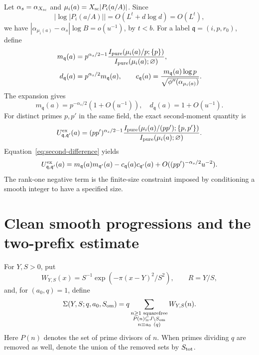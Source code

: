Let \(\alpha_s=\alpha_{X_{\rm sc}}\) and
\(\mu_i(a)=X_{\rm sc}|P_i(a/A)|\).  Since
\[
 |\log|P_i(a/A)||=O(L^t+d\log d)=O(L^t),
\]
we have
\( |\alpha_{\mu_i(a)}-\alpha_s|\log B=o(u^{-1})\), by \(t<b\).
For a label \(\mathfrak q=(i,p,r_0)\), define
\begin{align*}
 m_{\mathfrak q}(a)
 &=p^{\alpha_s/2-1}
       \frac{I_{\rm pure}(\mu_i(a)/p;\{p\})}
            {I_{\rm pure}(\mu_i(a);\varnothing)},\\
 d_{\mathfrak q}(a)&=p^{\alpha_s/2}m_{\mathfrak q}(a),
 \qquad
 c_{\mathfrak q}(a)=
       \frac{m_{\mathfrak q}(a)\log p}
            {\sqrt{\phi''(\alpha_{\mu_i(a)})}}.
\end{align*}
The expansion gives
\begin{equation}\label{eq:prime-moments}
 m_{\mathfrak q}(a)=p^{-\alpha_s/2}(1+O(u^{-1})),
 \quad d_{\mathfrak q}(a)=1+O(u^{-1}).
\end{equation}
For distinct primes \(p,p'\) in the same field, the exact second-moment
quantity is
\[
 U^{\rm ex}_{\mathfrak q,\mathfrak q'}(a)
 =(pp')^{\alpha_s/2-1}
   \frac{I_{\rm pure}(\mu_i(a)/(pp');\{p,p'\})}
        {I_{\rm pure}(\mu_i(a);\varnothing)}.
\]
Equation~\eqref{eq:second-difference} yields
\begin{equation}\label{eq:covariance}
 U^{\rm ex}_{\mathfrak q,\mathfrak q'}(a)
 =m_{\mathfrak q}(a)m_{\mathfrak q'}(a)
  -c_{\mathfrak q}(a)c_{\mathfrak q'}(a)
  +O((pp')^{-\alpha_s/2}u^{-2}).
\end{equation}
The rank-one negative term is the finite-size constraint imposed by
conditioning a smooth integer to have a specified size.

\section{Clean smooth progressions and the two-prefix estimate}
\label{sec:progressions}

For \(Y,S>0\), put
\[
 W_{Y,S}(x)=S^{-1}\exp(-\pi(x-Y)^2/S^2),\qquad R=Y/S,
\]
and, for \((a_0,q)=1\), define
\begin{equation}\label{eq:sigma}
 \Sigma(Y,S;q,a_0,S_{\rm om})
 =q\sum_{\substack{n\ge1\text{ squarefree}\\
              P(n)\subseteq J\setminus S_{\rm om}\\n\equiv a_0\ (q)}}
              W_{Y,S}(n).
\end{equation}
Here \(P(n)\) denotes the set of prime divisors of \(n\).
When primes dividing \(q\) are removed as well, denote the union of
the removed sets by \(S_{\rm tot}\).

